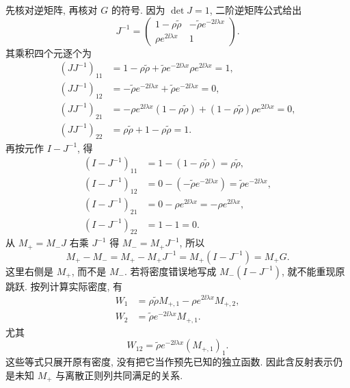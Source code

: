 \par\smallskip\noindent 先核对逆矩阵, 再核对 $G$ 的符号.\quad
因为 $\det J=1$, 二阶逆矩阵公式给出
\begin{equation*}
J^{-1}=\begin{pmatrix}
1-\rho\widetilde\rho&-\widetilde\rho e^{-2\ii\lambda x}\\
\rho e^{2\ii\lambda x}&1
\end{pmatrix}.
\end{equation*}
其乘积四个元逐个为
\begin{equation*}
\begin{aligned}
(JJ^{-1})_{11}
&=1-\rho\widetilde\rho
+\widetilde\rho e^{-2\ii\lambda x}\rho e^{2\ii\lambda x}=1,\\
(JJ^{-1})_{12}
&=-\widetilde\rho e^{-2\ii\lambda x}
+\widetilde\rho e^{-2\ii\lambda x}=0,\\
(JJ^{-1})_{21}
&=-\rho e^{2\ii\lambda x}(1-\rho\widetilde\rho)
+(1-\rho\widetilde\rho)\rho e^{2\ii\lambda x}=0,\\
(JJ^{-1})_{22}
&=\rho\widetilde\rho+1-\rho\widetilde\rho=1.
\end{aligned}
\end{equation*}
再按元作 $I-J^{-1}$, 得
\begin{equation*}
\begin{aligned}
(I-J^{-1})_{11}&=1-(1-\rho\widetilde\rho)=\rho\widetilde\rho,\\
(I-J^{-1})_{12}&=0-(-\widetilde\rho e^{-2\ii\lambda x})
=\widetilde\rho e^{-2\ii\lambda x},\\
(I-J^{-1})_{21}&=0-\rho e^{2\ii\lambda x}
=-\rho e^{2\ii\lambda x},\\
(I-J^{-1})_{22}&=1-1=0.
\end{aligned}
\end{equation*}
从 $M_+=M_-J$ 右乘 $J^{-1}$ 得 $M_-=M_+J^{-1}$, 所以
\begin{equation*}
M_+-M_-=M_+-M_+J^{-1}=M_+(I-J^{-1})=M_+G.
\end{equation*}
这里右侧是 $M_+$, 而不是 $M_-$.
若将密度错误地写成 $M_-(I-J^{-1})$, 就不能重现原跳跃.
按列计算实际密度, 有
\begin{equation*}
\begin{aligned}
W_1
&=\rho\widetilde\rho M_{+,1}
-\rho e^{2\ii\lambda x}M_{+,2},\\
W_2
&=\widetilde\rho e^{-2\ii\lambda x}M_{+,1}.
\end{aligned}
\end{equation*}
尤其
\begin{equation*}
W_{12}=\widetilde\rho e^{-2\ii\lambda x}(M_{+,1})_1.
\end{equation*}
这些等式只展开原有密度, 没有把它当作预先已知的独立函数.
因此含反射表示仍是未知 $M_+$ 与离散正则列共同满足的关系.

